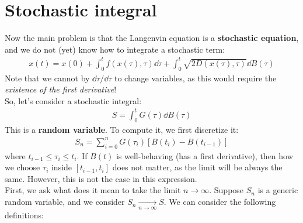 \documentclass[../template.tex]{subfiles}
\begin{document}
\section{Stochastic integral}
Now the main problem is that the Langenvin equation is a \textbf{stochastic equation}, and we do not (yet) know how to integrate a stochastic term:
\begin{align*}
    x(t) = x(0) + \int_0^t f(x(\tau), \tau) \dd{\tau} + \int_0^t \sqrt{2D(x(\tau), \tau)} \dd{B(\tau)} 
\end{align*} 
Note that we cannot  by $\dd{\tau}/\dd{\tau}$ to change variables, as this would require the \textit{existence of the first derivative}!\\
So, let's consider a stochastic integral:
\begin{align*}
    S = \int_0^t G(\tau) \dd{B}(\tau)
\end{align*}  
This is a \textbf{random variable}. To compute it, we first discretize it:
\begin{align*}
    S_n = \sum_{i=0}^{n} G(\tau_i) [B(t_i) - B(t_{i-1})]
\end{align*}
where $t_{i-1} \leq \tau_i \leq t_i$. If $B(t)$ is well-behaving (has a first derivative), then how we choose $\tau_i$ inside $[t_{i-1},t_i]$ does not matter, as the limit will be always the same. However, this is not the case in this expression.\\
First, we ask what does it mean to take the limit $n \to \infty$. Suppose $S_n$ is a generic random variable, and we consider $S_n  \xrightarrow[n \to \infty]{} S$. We can consider the following definitions:
\end{document}
